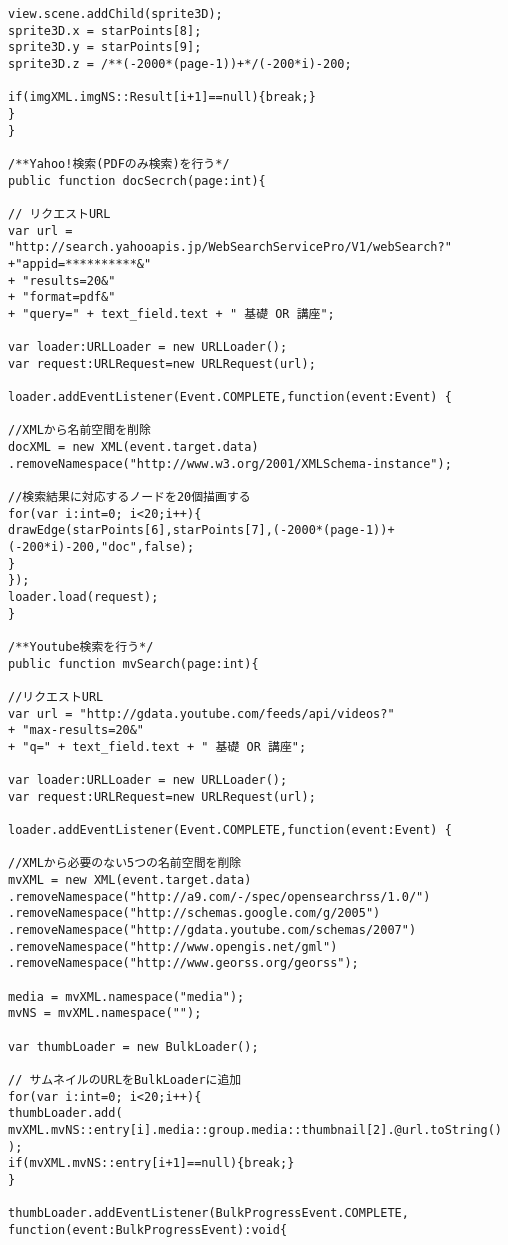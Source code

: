 {\begin{verbatim}
view.scene.addChild(sprite3D);
sprite3D.x = starPoints[8];
sprite3D.y = starPoints[9];
sprite3D.z = /**(-2000*(page-1))+*/(-200*i)-200;

if(imgXML.imgNS::Result[i+1]==null){break;}
}
}

/**Yahoo!検索(PDFのみ検索)を行う*/
public function docSecrch(page:int){

// リクエストURL
var url = "http://search.yahooapis.jp/WebSearchServicePro/V1/webSearch?"
+"appid=**********&"
+ "results=20&"
+ "format=pdf&"
+ "query=" + text_field.text + " 基礎 OR 講座";

var loader:URLLoader = new URLLoader();
var request:URLRequest=new URLRequest(url);

loader.addEventListener(Event.COMPLETE,function(event:Event) {

//XMLから名前空間を削除
docXML = new XML(event.target.data)
.removeNamespace("http://www.w3.org/2001/XMLSchema-instance");

//検索結果に対応するノードを20個描画する
for(var i:int=0; i<20;i++){
drawEdge(starPoints[6],starPoints[7],(-2000*(page-1))+(-200*i)-200,"doc",false);
}
});
loader.load(request);
}

/**Youtube検索を行う*/
public function mvSearch(page:int){

//リクエストURL
var url = "http://gdata.youtube.com/feeds/api/videos?"
+ "max-results=20&"
+ "q=" + text_field.text + " 基礎 OR 講座";

var loader:URLLoader = new URLLoader();
var request:URLRequest=new URLRequest(url);

loader.addEventListener(Event.COMPLETE,function(event:Event) {

//XMLから必要のない5つの名前空間を削除
mvXML = new XML(event.target.data)
.removeNamespace("http://a9.com/-/spec/opensearchrss/1.0/")
.removeNamespace("http://schemas.google.com/g/2005")
.removeNamespace("http://gdata.youtube.com/schemas/2007")
.removeNamespace("http://www.opengis.net/gml")
.removeNamespace("http://www.georss.org/georss");

media = mvXML.namespace("media");
mvNS = mvXML.namespace("");

var thumbLoader = new BulkLoader();

// サムネイルのURLをBulkLoaderに追加
for(var i:int=0; i<20;i++){
thumbLoader.add(
mvXML.mvNS::entry[i].media::group.media::thumbnail[2].@url.toString()
);
if(mvXML.mvNS::entry[i+1]==null){break;}
}

thumbLoader.addEventListener(BulkProgressEvent.COMPLETE,
function(event:BulkProgressEvent):void{


\end{verbatim}}

